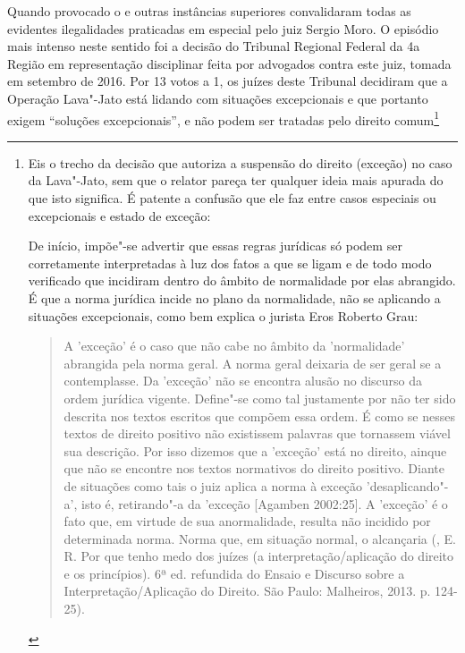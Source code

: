 Quando provocado o  e outras instâncias superiores convalidaram todas
as evidentes ilegalidades praticadas em especial pelo juiz Sergio Moro.
O episódio mais intenso neste sentido foi a decisão do Tribunal Regional
Federal da 4a Região em representação disciplinar feita por advogados
contra este juiz, tomada em setembro de 2016. Por 13 votos a 1, os
juízes deste Tribunal decidiram que a Operação Lava"-Jato está lidando
com situações excepcionais e que portanto exigem ``soluções
excepcionais'', e não podem ser tratadas pelo direito comum\footnote{Eis
  o trecho da decisão que autoriza a suspensão do direito (exceção) no
  caso da Lava"-Jato, sem que o relator pareça ter qualquer ideia mais
  apurada do que isto significa. É patente a confusão que ele faz entre
  casos especiais ou excepcionais e estado de exceção:

  De início, impõe"-se advertir que essas regras jurídicas só podem ser
  corretamente interpretadas à luz dos fatos a que se ligam e de todo
  modo verificado que incidiram dentro do âmbito de normalidade por elas
  abrangido. É que a norma jurídica incide no plano da normalidade, não
  se aplicando a situações excepcionais, como bem explica o jurista Eros
  Roberto Grau:

  \begin{quote}
  A 'exceção' é o caso que não cabe no âmbito da 'normalidade' abrangida
  pela norma geral. A norma geral deixaria de ser geral se a
  contemplasse. Da 'exceção' não se encontra alusão no discurso da ordem
  jurídica vigente. Define"-se como tal justamente por não ter sido
  descrita nos textos escritos que compõem essa ordem. É como se nesses
  textos de direito positivo não existissem palavras que tornassem
  viável sua descrição. Por isso dizemos que a 'exceção' está no
  direito, ainque que não se encontre nos textos normativos do direito
  positivo. Diante de situações como tais o juiz aplica a norma à
  exceção 'desaplicando"-a', isto é, retirando"-a da 'exceção {[}Agamben
  2002:25{]}. A 'exceção' é o fato que, em virtude de sua anormalidade,
  resulta não incidido por determinada norma. Norma que, em situação
  normal, o alcançaria (, E. R. Por que tenho medo dos juízes (a
  interpretação/aplicação do direito e os princípios). 6ª ed. refundida
  do Ensaio e Discurso sobre a Interpretação/Aplicação do Direito. São
  Paulo: Malheiros, 2013. p. 124-25).
  \end{quote}

}
